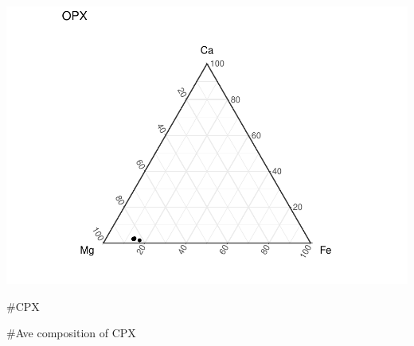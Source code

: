 \documentclass[
]{article}
\begin{document}
\includegraphics{KBH_94_23_DE_5_all_pyx_lines_files/figure-latex/unnamed-chunk-5-1.pdf}

\#CPX

\#Ave composition of CPX
\end{document}
